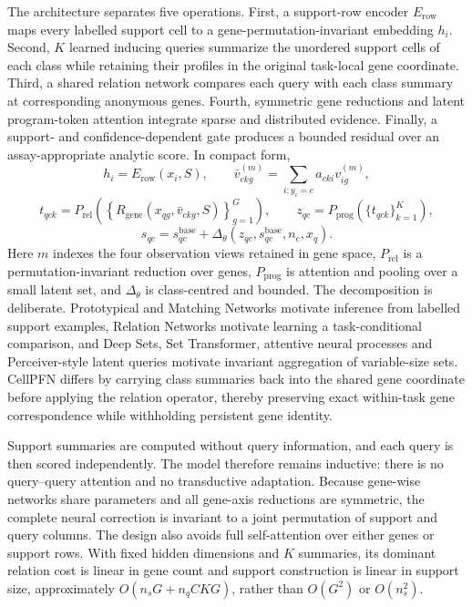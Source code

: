 \documentclass[12pt]{article}
\begin{document}
The architecture separates five operations. First, a support-row encoder $E_{\mathrm{row}}$ maps every labelled support cell to a gene-permutation-invariant embedding $h_i$. Second, $K$ learned inducing queries summarize the unordered support cells of each class while retaining their profiles in the original task-local gene coordinate. Third, a shared relation network compares each query with each class summary at corresponding anonymous genes. Fourth, symmetric gene reductions and latent program-token attention integrate sparse and distributed evidence. Finally, a support- and confidence-dependent gate produces a bounded residual over an assay-appropriate analytic score. In compact form,
\begin{equation}
 h_i=E_{\mathrm{row}}(x_i,S),\qquad
 \bar v^{(m)}_{ckg}=\sum_{i:y_i=c}a_{cki}v^{(m)}_{ig},
\end{equation}
\begin{equation}
 t_{qck}=P_{\mathrm{rel}}\!\left(\left\{R_{\mathrm{gene}}(x_{qg},\bar v_{ckg},S)\right\}_{g=1}^{G}\right),\qquad
 z_{qc}=P_{\mathrm{prog}}\!\left(\{t_{qck}\}_{k=1}^{K}\right),
\end{equation}
\begin{equation}
 s_{qc}=s^{\mathrm{base}}_{qc}+\Delta_\theta(z_{qc},s^{\mathrm{base}}_{qc},n_c,x_q).
\end{equation}
Here $m$ indexes the four observation views retained in gene space, $P_{\mathrm{rel}}$ is a permutation-invariant reduction over genes, $P_{\mathrm{prog}}$ is attention and pooling over a small latent set, and $\Delta_\theta$ is class-centred and bounded. The decomposition is deliberate. Prototypical and Matching Networks motivate inference from labelled support examples, Relation Networks motivate learning a task-conditional comparison, and Deep Sets, Set Transformer, attentive neural processes and Perceiver-style latent queries motivate invariant aggregation of variable-size sets\cite{snell2017prototypical,vinyals2016matching,sung2018relation,zaheer2017deepsets,lee2019settransformer,kim2019anp,jaegle2021perceiver}. CellPFN differs by carrying class summaries back into the shared gene coordinate before applying the relation operator, thereby preserving exact within-task gene correspondence while withholding persistent gene identity.

Support summaries are computed without query information, and each query is then scored independently. The model therefore remains inductive: there is no query--query attention and no transductive adaptation. Because gene-wise networks share parameters and all gene-axis reductions are symmetric, the complete neural correction is invariant to a joint permutation of support and query columns. The design also avoids full self-attention over either genes or support rows. With fixed hidden dimensions and $K$ summaries, its dominant relation cost is linear in gene count and support construction is linear in support size, approximately $O(n_sG+n_qCKG)$, rather than $O(G^2)$ or $O(n_s^2)$.
\end{document}
